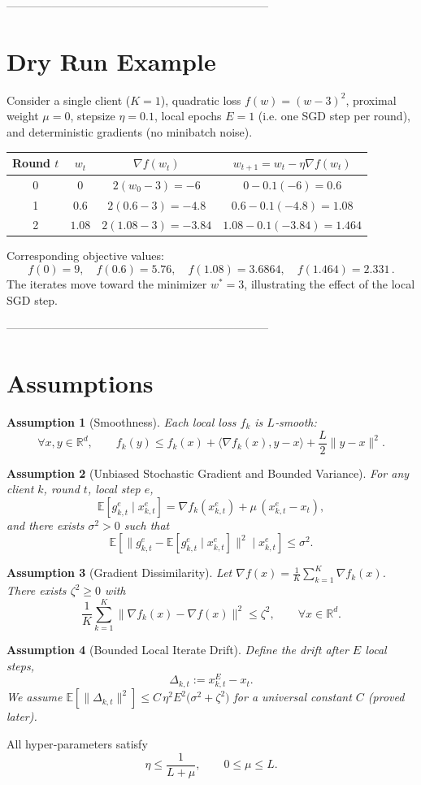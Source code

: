 \documentclass{article}
\newtheorem{assumption}{Assumption}
\newcommand{\EE}{\mathbb{E}}
\newcommand{\RR}{\mathbb{R}}
\begin{document}
---------------------------------------------------------------------

\section*{Dry Run Example}
Consider a single client ($K=1$), quadratic loss $f(w)=(w-3)^{2}$, proximal weight $\mu=0$, stepsize $\eta=0.1$, local epochs $E=1$ (i.e. one SGD step per round), and deterministic gradients (no minibatch noise).

\begin{center}
\begin{tabular}{c|c|c|c}
Round $t$ & $w_t$ & $\nabla f(w_t)$ & $w_{t+1}=w_t-\eta\nabla f(w_t)$\\ \hline
0 & $0$   & $2(w_0-3)=-6$ & $0-0.1(-6)=0.6$\\
1 & $0.6$ & $2(0.6-3)=-4.8$ & $0.6-0.1(-4.8)=1.08$\\
2 & $1.08$& $2(1.08-3)=-3.84$ & $1.08-0.1(-3.84)=1.464$\\
\end{tabular}
\end{center}
Corresponding objective values:
\[
f(0)=9,\quad f(0.6)=5.76,\quad f(1.08)=3.6864,\quad f(1.464)=2.331\,.
\]
The iterates move toward the minimizer $w^{*}=3$, illustrating the effect of the local SGD step.

---------------------------------------------------------------------

\section*{Assumptions}
\begin{assumption}[Smoothness]
Each local loss $f_k$ is $L$‑smooth:
\[
\forall x,y\in\RR^{d},\qquad 
f_k(y)\le f_k(x)+\langle\nabla f_k(x),y-x\rangle+\frac{L}{2}\|y-x\|^{2}.
\]
\end{assumption}
\begin{assumption}[Unbiased Stochastic Gradient and Bounded Variance]
For any client $k$, round $t$, local step $e$,
\[
\EE\!\left[ g_{k,t}^{e}\mid x_{k,t}^{e} \right]=\nabla f_k(x_{k,t}^{e})+\mu\,(x_{k,t}^{e}-x_t),
\]
and there exists $\sigma^{2}>0$ such that
\[
\EE\!\left[\|g_{k,t}^{e}-\EE[g_{k,t}^{e}\mid x_{k,t}^{e}]\|^{2}\mid x_{k,t}^{e}\right]\le\sigma^{2}.
\]
\end{assumption}
\begin{assumption}[Gradient Dissimilarity]
Let $\nabla f(x)=\frac{1}{K}\sum_{k=1}^{K}\nabla f_k(x)$. There exists $\zeta^{2}\ge0$ with
\[
\frac{1}{K}\sum_{k=1}^{K}\|\nabla f_k(x)-\nabla f(x)\|^{2}\le\zeta^{2},
\qquad\forall x\in\RR^{d}.
\]
\end{assumption}
\begin{assumption}[Bounded Local Iterate Drift]
Define the drift after $E$ local steps,
\[
\Delta_{k,t}:=x_{k,t}^{E}-x_{t}.
\]
We assume $\EE\!\left[\|\Delta_{k,t}\|^{2}\right]\le C\,\eta^{2}E^{2}\bigl(\sigma^{2}+\zeta^{2}\bigr)$ for a universal constant $C$ (proved later).
\end{assumption}
All hyper‑parameters satisfy
\[
\eta\le\frac{1}{L+\mu},\qquad 0\le\mu\le L.
\]
\end{document}
